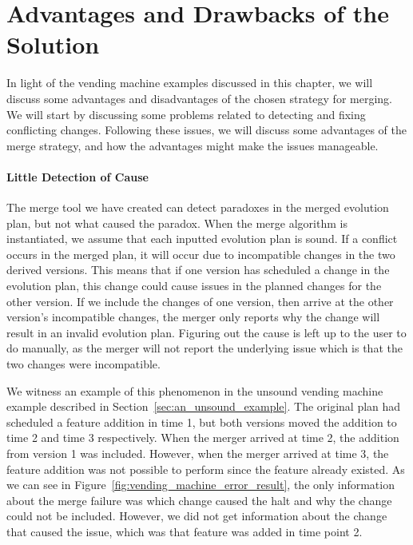 \documentclass[a4paper,english]{ifimaster}
\begin{document}
\section{Advantages and Drawbacks of the Solution}%
\label{sec:advantages_and_drawbacks_of_the_solution}

In light of the vending machine examples discussed in this chapter, we will discuss some advantages and disadvantages of the chosen strategy for merging. We will start by discussing some problems related to detecting and fixing conflicting changes. Following these issues, we will discuss some advantages of the merge strategy, and how the advantages might make the issues manageable.

\paragraph{Little Detection of Cause}%
\label{par:little_detection_of_cause}

The merge tool we have created can detect paradoxes in the merged evolution plan, but not what caused the paradox. When the merge algorithm is instantiated, we assume that each inputted evolution plan is sound. If a conflict occurs in the merged plan, it will occur due to incompatible changes in the two derived versions. This means that if one version has scheduled a change in the evolution plan, this change could cause issues in the planned changes for the other version. If we include the changes of one version, then arrive at the other version's incompatible changes, the merger only reports why the change will result in an invalid evolution plan. Figuring out the cause is left up to the user to do manually, as the merger will not report the underlying issue which is that the two changes were incompatible.

We witness an example of this phenomenon in the unsound vending machine example described in Section~\vref{sec:an_unsound_example}. The original plan had scheduled a feature addition in time 1, but both versions moved the addition to time 2 and time 3 respectively. When the merger arrived at time 2, the addition from version 1 was included. However, when the merger arrived at time 3, the feature addition was not possible to perform since the feature already existed. As we can see in Figure~\vref{fig:vending_machine_error_result}, the only information about the merge failure was which change caused the halt and why the change could not be included. However, we did not get information about the change that caused the issue, which was that feature was added in time point 2.
\end{document}
